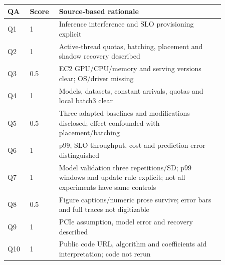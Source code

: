 \begin{longtable}{P{0.09\linewidth}P{0.10\linewidth}P{0.67\linewidth}}
\toprule QA & Score & Source-based rationale\\\midrule\endhead
Q1 & 1 & Inference interference and SLO provisioning explicit\\
Q2 & 1 & Active-thread quotas, batching, placement and shadow recovery described\\
Q3 & 0.5 & EC2 GPU/CPU/memory and serving versions clear; OS/driver missing\\
Q4 & 1 & Models, datasets, constant arrivals, quotas and local batch3 clear\\
Q5 & 0.5 & Three adapted baselines and modifications disclosed; effect confounded with placement/batching\\
Q6 & 1 & p99, SLO throughput, cost and prediction error distinguished\\
Q7 & 1 & Model validation three repetitions/SD; p99 windows and update rule explicit; not all experiments have same controls\\
Q8 & 0.5 & Figure captions/numeric prose survive; error bars and full traces not digitizable\\
Q9 & 1 & PCIe assumption, model error and recovery described\\
Q10 & 1 & Public code URL, algorithm and coefficients aid interpretation; code not rerun\\
\bottomrule\end{longtable}

